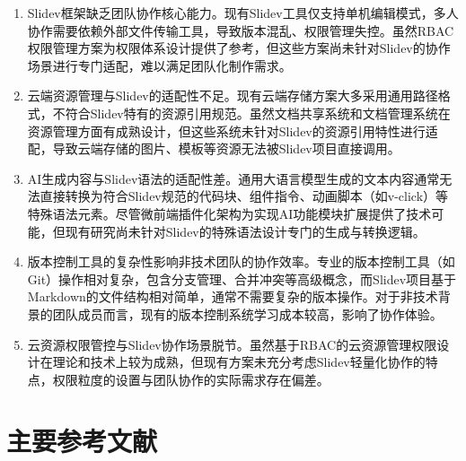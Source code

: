 \begin{enumerate}[label=(\arabic*)]
    \item Slidev框架缺乏团队协作核心能力。现有Slidev工具仅支持单机编辑模式，多人协作需要依赖外部文件传输工具，导致版本混乱、权限管理失控。虽然RBAC权限管理方案为权限体系设计提供了参考，但这些方案尚未针对Slidev的协作场景进行专门适配，难以满足团队化制作需求。
    
    \item 云端资源管理与Slidev的适配性不足。现有云端存储方案大多采用通用路径格式，不符合Slidev特有的资源引用规范。虽然文档共享系统和文档管理系统在资源管理方面有成熟设计，但这些系统未针对Slidev的资源引用特性进行适配，导致云端存储的图片、模板等资源无法被Slidev项目直接调用。
    
    \item AI生成内容与Slidev语法的适配性差。通用大语言模型生成的文本内容通常无法直接转换为符合Slidev规范的代码块、组件指令、动画脚本（如v-click）等特殊语法元素。尽管微前端插件化架构为实现AI功能模块扩展提供了技术可能，但现有研究尚未针对Slidev的特殊语法设计专门的生成与转换逻辑。
    
    \item 版本控制工具的复杂性影响非技术团队的协作效率。专业的版本控制工具（如Git）操作相对复杂，包含分支管理、合并冲突等高级概念，而Slidev项目基于Markdown的文件结构相对简单，通常不需要复杂的版本操作。对于非技术背景的团队成员而言，现有的版本控制系统学习成本较高，影响了协作体验。
    
    \item 云资源权限管控与Slidev协作场景脱节。虽然基于RBAC的云资源管理权限设计在理论和技术上较为成熟，但现有方案未充分考虑Slidev轻量化协作的特点，权限粒度的设置与团队协作的实际需求存在偏差。
\end{enumerate}

\section{主要参考文献}
